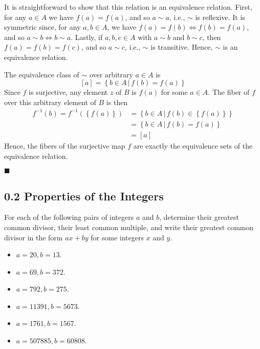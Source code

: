 \documentclass[12pt]{article}
\renewcommand{\qed}{\hfill$\blacksquare$}
\renewenvironment{proof}{\begin{addmargin}[1em]{0em}\begin{newproof}}{\end{newproof}\end{addmargin}\qed}
\newenvironment{problem}[2][Exercise]{\begin{trivlist}
\item[\hskip \labelsep {\bfseries #1}\hskip \labelsep {\bfseries #2.}]}{\end{trivlist}}
\begin{document}
\begin{proof}
It is straightforward to show that this relation is an equivalence relation. First, for any $a\in A$ we have $f\left(a\right)=f\left(a\right)$, and so $a\sim a$, i.e., $\sim$ is reflexive. It is symmetric since, for any $a,b\in A$, we have $f\left(a\right)=f\left(b\right) \iff f\left(b\right)=f\left(a\right)$, and so $a\sim b \iff b\sim a$. Lastly, if $a,b,c\in A$ with $a\sim b$ and $b\sim c$, then $f\left(a\right) = f\left(b\right) = f\left(c\right)$, and so $a\sim c$, i.e., $\sim$ is transitive. Hence, $\sim$ is an equivalence relation.

The equivalence class of $\sim$ over arbitrary $a\in A$ is
$$ \left[a\right] = \left\{ b\in A \, | \, f\left(b\right)=f\left(a\right) \right\} $$
Since $f$ is surjective, any element $z$ of $B$ is $f\left(a\right)$ for some $a\in A$. The fiber of $f$ over this arbitrary element of $B$ is then
\begin{equation*} \begin{split}f^{-1}\left(b\right)= f^{-1}\left(\left\{ f\left(a\right) \right\} \right) & = \left\{ b\in A \, | \, f\left(b\right) \in \left\{ f\left(a\right) \right\} \right\} \\
& = \left\{ b\in A \, | \, f\left(b\right) = f\left(a\right) \right\} \\
& = \left[a\right]
\end{split}\end{equation*}
Hence, the fibers of the surjective map $f$ are exactly the equivalence sets of the equivalence relation.
\end{proof}





\subsection*{0.2 Properties of the Integers}

\begin{problem}{0.2.1}
For each of the following pairs of integers $a$ and $b$, determine their greatest common divisor, their least common multiple, and write their greatest common divisor in the form $ax+by$ for some integers $x$ and $y$.
\begin{itemize}
    \item $a=20,b=13$.
    \item $a=69,b=372$.
    \item $a=792,b=275$.
    \item $a=11391,b=5673$.
    \item $a=1761,b=1567$.
    \item $a=507885,b=60808$.
\end{itemize}
\end{problem}
\end{document}
